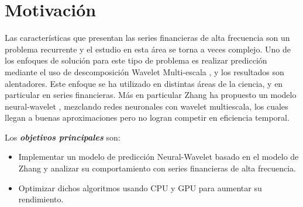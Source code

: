 %

\section{Motivación}

Las características que presentan las series financieras de alta frecuencia son un problema recurrente y el estudio en esta área se torna a veces complejo.
Uno de los enfoques de solución para este tipo de problema es realizar predicción mediante el uso de descomposición Wavelet Multi-escala \cite{benaouda2006wavelet}, y 
los resultados son alentadores. Este enfoque se ha utilizado en distintas áreas de la ciencia, y en particular en series financieras. Más en particular Zhang ha propuesto 
un modelo neural-wavelet \cite{zhang2001adaptive}, mezclando redes neuronales con wavelet multiescala, los cuales llegan a buenas aproximaciones pero no logran competir 
en eficiencia temporal.


Los \emph{\textbf{objetivos principales}} son:
\begin{itemize}
	\item Implementar un modelo de predicción Neural-Wavelet basado en el modelo de Zhang y analizar su comportamiento con series
		financieras de alta frecuencia.
	\item Optimizar dichos algoritmos  usando CPU y GPU para aumentar su rendimiento.
\end{itemize} 


